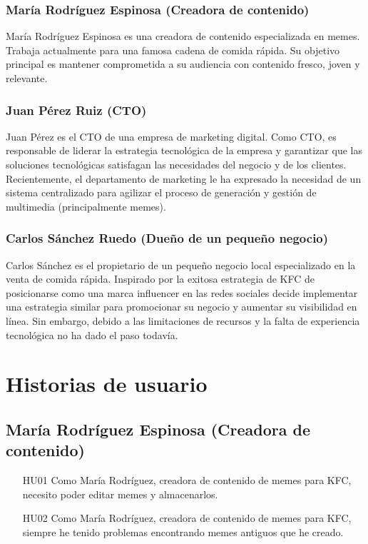     \subsubsection{María Rodríguez Espinosa (Creadora de contenido)}

    María Rodríguez Espinosa es una creadora de contenido especializada en memes. Trabaja actualmente para una famosa cadena de comida rápida. Su objetivo principal es mantener comprometida a su audiencia con contenido fresco, joven y relevante.

    \subsubsection{Juan Pérez Ruiz (CTO)}

    Juan Pérez es el CTO de una empresa de marketing digital. Como CTO, es responsable de liderar la estrategia tecnológica de la empresa y garantizar que las soluciones tecnológicas satisfagan las necesidades del negocio y de los clientes. Recientemente, el departamento de marketing le ha expresado la necesidad de un sistema centralizado para agilizar el proceso de generación y gestión de multimedia (principalmente memes).

    \subsubsection{Carlos Sánchez Ruedo (Dueño de un pequeño negocio)}

    Carlos Sánchez es el propietario de un pequeño negocio local especializado en la venta de comida rápida. Inspirado por la exitosa estrategia de KFC de posicionarse como una marca influencer en las redes sociales decide implementar una estrategia similar para promocionar su negocio y aumentar su visibilidad en línea. Sin embargo, debido a las limitaciones de recursos y la falta de experiencia tecnológica no ha dado el paso todavía.

\section{Historias de usuario}

    \subsection{María Rodríguez Espinosa (Creadora de contenido)}

    \begin{enumerate}
        \item [HU01] Como María Rodríguez, creadora de contenido de memes para KFC, necesito poder editar memes y almacenarlos.
        \item [HU02] Como María Rodríguez, creadora de contenido de memes para KFC, siempre he tenido problemas encontrando memes antiguos que he creado.
    \end{enumerate}

